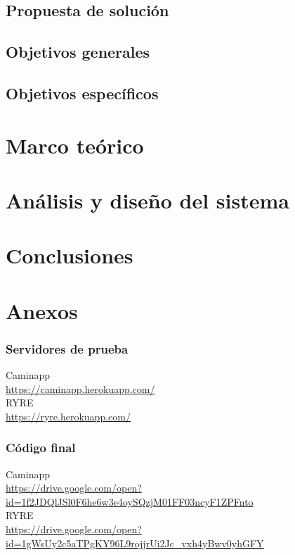 \documentclass[12pt]{report}
\begin{document}
\section{Propuesta de solución}


\section{Objetivos generales}


\section{Objetivos específicos}



\chapter{Marco teórico}


\chapter{Análisis y diseño del sistema}


\chapter{Conclusiones}


\chapter{Anexos}
\subsection{Servidores de prueba}

Caminapp\\
\url{https://caminapp.herokuapp.com/}\\

RYRE\\
\url{https://ryre.herokuapp.com/}\\

\subsection{Código final}

Caminapp\\
\url{https://drive.google.com/open?id=1f2JDQlJSl0F6he6w3e4oySQzjM01FF03ncyF1ZPFnto}\\

RYRE\\
\url{https://drive.google.com/open?id=1gWsUy2c5aTPgKY96L9rojjrUi2Jc_vxh4yBwv0yhGFY}\\

\printbibliography

\printglossary

\clearpage

\printglossary[type=\acronymtype]
\end{document}
